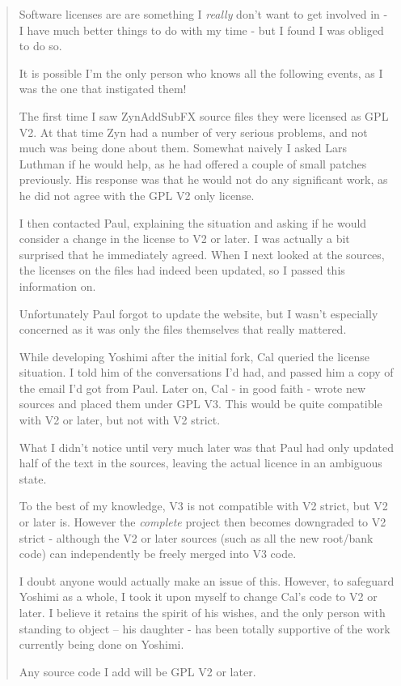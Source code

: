 \documentclass[
 11pt,
 twoside,
 a4paper,
 final                                 %
]{article}
\begin{document}
   \begin{quotation}
      Software licenses are are something I \textsl{really}
      don't want to get involved in - I have much better things to do with my
      time - but I found I was obliged to do so.

      It is possible I'm the only person who knows all the following events, as
      I was the one that instigated them!

      The first time I saw ZynAddSubFX source files they were licensed as GPL
      V2. At that time Zyn had a number of very serious problems, and not much
      was being done about them. Somewhat naively I asked Lars Luthman if he
      would help, as he had offered a couple of small patches previously. His
      response was that he would not do any significant work, as he did not
      agree with the GPL V2 only license.

      I then contacted Paul, explaining the situation and asking if he would
      consider a change in the license to V2 or later. I was actually a bit
      surprised that he immediately agreed. When I next looked at the sources,
      the licenses on the files had indeed been updated, so I passed this
      information on.

      Unfortunately Paul forgot to update the website, but I wasn't especially
      concerned as it was only the files themselves that really mattered.

      While developing Yoshimi after the initial fork, Cal queried the license
      situation. I told him of the conversations I'd had, and passed him a copy
      of the email I'd got from Paul. Later on, Cal - in good faith - wrote new
      sources and placed them under GPL V3. This would be quite compatible with
      V2 or later, but not with V2 strict.

      What I didn't notice until very much later was that Paul had only updated
      half of the text in the sources, leaving the actual licence in an
      ambiguous state.

      To the best of my knowledge, V3 is not compatible with V2 strict, but V2
      or later is. However the \textsl{complete}
      project then becomes downgraded to V2
      strict - although the V2 or later sources (such as all the new root/bank
      code) can independently be freely merged into V3 code.

      I doubt anyone would actually make an issue of this. However, to safeguard
      Yoshimi as a whole, I took it upon myself to change Cal's code to V2 or
      later. I believe it retains the spirit of his wishes, and the only person
      with standing to object -- his daughter - has been totally supportive of
      the work currently being done on Yoshimi.

      Any source code I add will be GPL V2 or later.
      \end{quotation}
\end{document}
